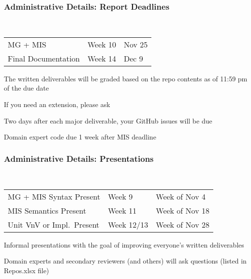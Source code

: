 \documentclass[t,12pt,numbers,fleqn]{beamer}
\begin{document}



\begin{frame}
\frametitle{Administrative Details: Report Deadlines}
~\newline
\begin{tabular}{l l l}
MG + MIS & Week 10 & Nov 25\\
Final Documentation & Week 14 & Dec 9\\
\end {tabular}

\bi
\item The written deliverables will be graded based on the repo contents as of
11:59 pm of the due date
\item If you need an extension, please ask
\item Two days after each major deliverable, your GitHub issues will be due
\item Domain expert code due 1 week after MIS deadline
\ei

\end{frame}


\begin{frame}
\frametitle{Administrative Details: Presentations}

~\newline
\begin{tabular}{l l l}
MG + MIS Syntax Present & Week 9 & Week of Nov 4\\
MIS Semantics Present & Week 11 & Week of Nov 18\\
Unit VnV or Impl.\ Present & Week 12/13 & Week of Nov 28\\
\end {tabular}

\bi
\item Informal presentations with the goal of improving everyone's written
  deliverables
\item Domain experts and secondary reviewers (and others) will ask questions
  (listed in Repos.xlsx file)
\ei

\end{frame}

\end{document}
